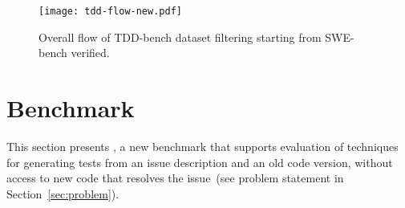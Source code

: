 \begin{figure*}[h]
    \centering
    \texttt{[image: tdd-flow-new.pdf]}
    \vspace{-.4cm}
    \caption{Overall flow of TDD-bench dataset filtering starting from SWE-bench verified.}
    \label{fig:tdd-flow}
    \vspace{-.3cm}
\end{figure*}




\section{\tdd Benchmark}
\label{sec:tddbench}


This section presents \tdd, a new benchmark that supports evaluation of
techniques for generating tests from an issue description and an old code
version, without access to new code that resolves the
issue~(see problem statement in Section~\ref{sec:problem}).






